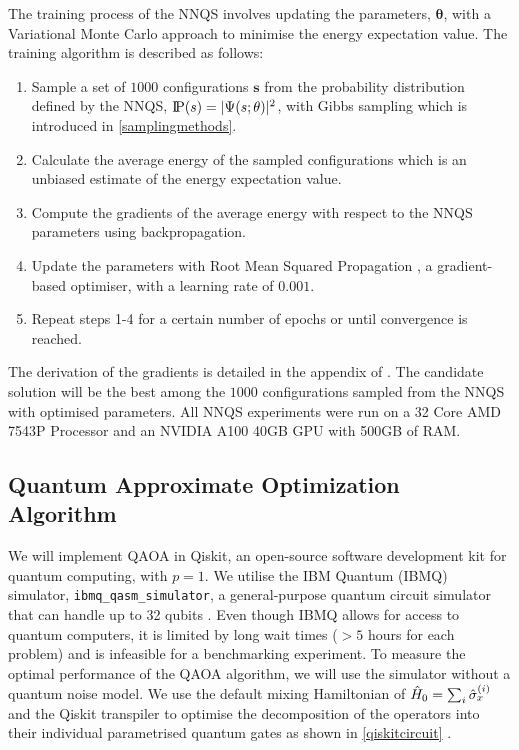 The training process of the NNQS involves updating the parameters, $\boldsymbol{\theta}$, with a Variational Monte Carlo approach to minimise the energy expectation value. The training algorithm is described as follows:
\begin{enumerate}
    \item Sample a set of $1000$ configurations $\mathbf{s}$ from the probability distribution defined by the NNQS, $\text{I\kern-0.15em P}(s) = |\Psi(s;\theta)|^2$, with Gibbs sampling which is introduced in \autoref{samplingmethods}.
    \item Calculate the average energy of the sampled configurations which is an unbiased estimate of the energy expectation value.
    \item Compute the gradients of the average energy with respect to the NNQS parameters using backpropagation.
    \item Update the parameters with Root Mean Squared Propagation \cite{rmsprop}, a gradient-based optimiser, with a learning rate of $0.001$.
    \item Repeat steps 1-4 for a certain number of epochs or until convergence is reached.
\end{enumerate}
The derivation of the gradients is detailed in the appendix of . The candidate solution will be the best among the $1000$ configurations sampled from the NNQS with optimised parameters. All NNQS experiments were run on a 32 Core AMD 7543P Processor and an NVIDIA A100 40GB GPU with 500GB of RAM.

\subsection{Quantum Approximate Optimization Algorithm}
We will implement QAOA in Qiskit, an open-source software development kit for quantum computing, with $p=1$. We utilise the IBM Quantum (IBMQ) simulator, \texttt{ibmq\_qasm\_simulator}, a general-purpose quantum circuit simulator that can handle up to 32 qubits \cite{b24}. Even though IBMQ allows for access to quantum computers, it is limited by long wait times ($>5$ hours for each problem) and is infeasible for a benchmarking experiment. To measure the optimal performance of the QAOA algorithm, we will use the simulator without a quantum noise model. We use the default mixing Hamiltonian of $\Hat{H}_0 = \sum_{i}\Hat{\sigma}_x^{(i)}$ and the Qiskit transpiler to optimise the decomposition of the operators into their individual parametrised quantum gates as shown in \autoref{qiskitcircuit} \cite{qiskittranspiler}.

